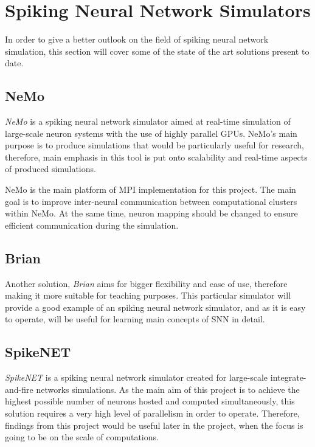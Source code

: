 \documentclass[12pt]{report}
\begin{document}
\section{Spiking Neural Network Simulators}

In order to give a better outlook on the field of spiking neural network simulation, this section will cover some of the state of the art solutions present to date.

\subsection{NeMo}

\emph{NeMo} is a spiking neural network simulator aimed at real-time simulation of large-scale neuron systems with the use of highly parallel GPUs.\cite{AndreasK.Fidjeland2009}
NeMo's main purpose is to produce simulations that would be particularly useful for research, therefore, main emphasis in this tool is put onto scalability and real-time aspects
of produced simulations.

NeMo is the main platform of MPI implementation for this project. The main goal is to improve inter-neural communication between computational clusters within NeMo.
At the same time, neuron mapping should be changed to ensure efficient communication during the simulation.

\subsection{Brian}

Another solution, \emph{Brian} aims for bigger flexibility and ease of use, therefore making it more suitable for teaching purposes. \cite{Goodman2008} This
particular simulator will provide a good example of an spiking neural network simulator, and as it is easy to operate, will be useful for learning main concepts
of SNN in detail.

\subsection{SpikeNET}

\emph{SpikeNET} is a spiking neural network simulator created for large-scale integrate-and-fire networks simulations.\cite{ArnaudDelorme1999} As the main aim of this project is to
achieve the highest possible number of neurons hosted and computed simultaneously, this solution requires a very high level of parallelism in order to operate.
Therefore, findings from this project would be useful later in the project, when the focus is going to be on the scale of computations.
\end{document}
